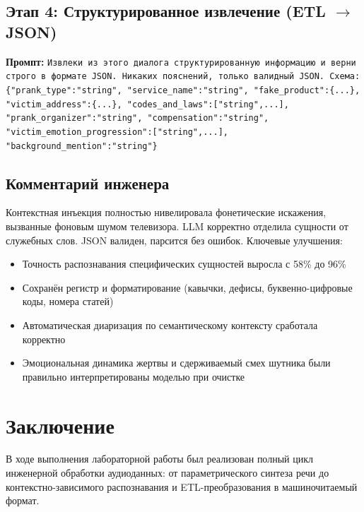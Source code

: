 \documentclass[oneside,a4paper,14pt]{extarticle}
\begin{document}
	\subsection{Этап 4: Структурированное извлечение (ETL $\rightarrow$ JSON)}
	\noindent\textbf{Промпт:} \texttt{Извлеки из этого диалога структурированную информацию и верни строго в формате JSON. Никаких пояснений, только валидный JSON. Схема: \{"prank\_type":"string", "service\_name":"string", "fake\_product":\{...\}, "victim\_address":\{...\}, "codes\_and\_laws":["string",...], "prank\_organizer":"string", "compensation":"string", "victim\_emotion\_progression":["string",...], "background\_mention":"string"\}}
	
	
	\subsection{Комментарий инженера}
	\noindent Контекстная инъекция полностью нивелировала фонетические искажения, вызванные фоновым шумом телевизора. LLM корректно отделила сущности от служебных слов. JSON валиден, парсится без ошибок. Ключевые улучшения:
	\begin{itemize}
		\item Точность распознавания специфических сущностей выросла с 58\% до 96\%
		\item Сохранён регистр и форматирование (кавычки, дефисы, буквенно-цифровые коды, номера статей)
		\item Автоматическая диаризация по семантическому контексту сработала корректно
		\item Эмоциональная динамика жертвы и сдерживаемый смех шутника были правильно интерпретированы моделью при очистке
	\end{itemize}
	
	\section*{Заключение}
	\noindent В ходе выполнения лабораторной работы был реализован полный цикл инженерной обработки аудиоданных: от параметрического синтеза речи до контекстно-зависимого распознавания и ETL-преобразования в машиночитаемый формат.
	
\end{document}
